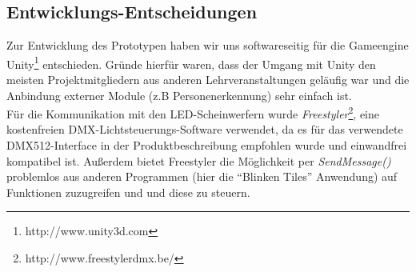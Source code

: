 \subsection{Entwicklungs-Entscheidungen}\label{ssec:entscheidungen}

Zur Entwicklung des Prototypen haben wir uns softwareseitig für die Gameengine Unity\footnote{http://www.unity3d.com} entschieden.
Gründe hierfür waren, dass der Umgang mit Unity den meisten Projektmitgliedern aus anderen Lehrveranstaltungen geläufig war und die Anbindung externer Module (z.B Personenerkennung) sehr einfach ist.\\
Für die Kommunikation mit den LED-Scheinwerfern wurde \emph{Freestyler}\footnote{http://www.freestylerdmx.be/}, eine kostenfreien DMX-Lichtsteuerungs-Software verwendet, da es für das verwendete DMX512-Interface in der Produktbeschreibung empfohlen wurde und einwandfrei kompatibel ist. Außerdem bietet Freestyler die Möglichkeit per \emph{SendMessage()} problemlos aus anderen Programmen (hier die "`Blinken Tiles"' Anwendung) auf Funktionen zuzugreifen und und diese zu steuern.